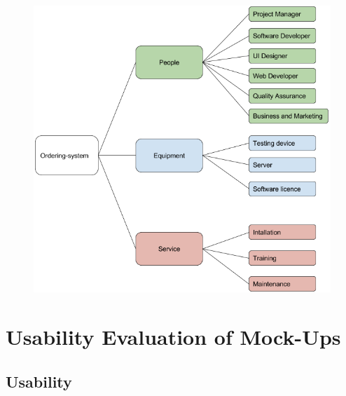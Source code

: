 \documentclass[11pt, a4paper]{report}
\begin{document}
\begin{figure}
\centering
\includegraphics[scale=0.8]{Figures/CostingBreakdown.png}
\end{figure}




\chapter{Usability Evaluation of Mock-Ups}
\pagebreak
\section{Usability} 
\end{document}

